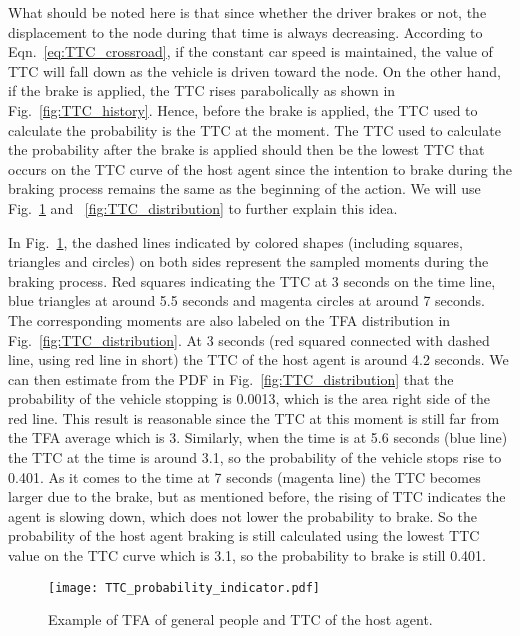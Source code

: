 What should be noted here is that since whether the driver brakes or not, the displacement to the node during that time is always decreasing. According to Eqn.~\ref{eq:TTC_crossroad}, if the constant car speed is maintained, the value of TTC will fall down as the vehicle is driven toward the node. On the other hand, if the brake is applied, the TTC rises parabolically as shown in Fig.~\ref{fig:TTC_history}. Hence, before the brake is applied, the TTC used to calculate the probability is the TTC at the moment. The TTC used to calculate the probability after the brake is applied should then be the lowest TTC that occurs on the TTC curve of the host agent since the intention to brake during the braking process remains the same as the beginning of the action. We will use Fig.~\ref{fig:TTC_TFA_indicator} and ~\ref{fig:TTC_distribution} to further explain this idea. 

In Fig.~\ref{fig:TTC_TFA_indicator}, the dashed lines indicated by colored shapes (including squares, triangles and circles) on both sides represent the sampled moments during the braking process. Red squares indicating the TTC at 3 seconds on the time line, blue triangles at around 5.5 seconds and magenta circles at around 7 seconds. The corresponding moments are also labeled on the TFA distribution in Fig.~\ref{fig:TTC_distribution}. At 3 seconds (red squared connected with dashed line, using red line in short) the TTC of the host agent is around 4.2 seconds. We can then estimate from the PDF in Fig.~\ref{fig:TTC_distribution} that the probability of the vehicle stopping is 0.0013, which is the area right side of the red line. This result is reasonable since the TTC at this moment is still far from the TFA average which is 3. Similarly, when the time is at 5.6 seconds (blue line) the TTC at the time is around 3.1, so the probability of the vehicle stops rise to 0.401. As it comes to the time at 7 seconds (magenta line) the TTC becomes larger due to the brake, but as mentioned before, the rising of TTC indicates the agent is slowing down, which does not lower the probability to brake. So the probability of the host agent braking is still calculated using the lowest TTC value on the TTC curve which is 3.1, so the probability to brake is still 0.401.

\begin{figure}[htbp!]
\begin{center}
\texttt{[image: TTC\_probability\_indicator.pdf]}
\end{center}
\caption{Example of TFA of general people and TTC of the host agent.}
\label{fig:TTC_TFA_indicator} 
\end{figure}

